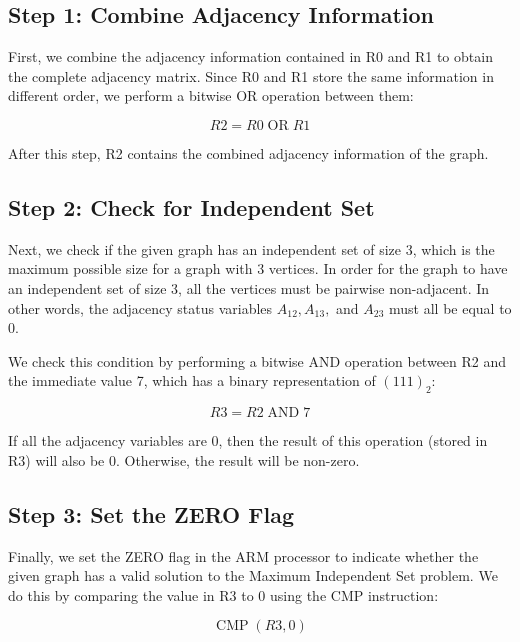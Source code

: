 \subsection{Step 1: Combine Adjacency Information}

First, we combine the adjacency information contained in R0 and R1 to obtain the complete adjacency matrix. Since R0 and R1 store the same information in different order, we perform a bitwise OR operation between them:

\begin{equation}
    R2 = R0 \operatorname{OR} R1
\end{equation}

After this step, R2 contains the combined adjacency information of the graph.

\subsection{Step 2: Check for Independent Set}

Next, we check if the given graph has an independent set of size 3, which is the maximum possible size for a graph with 3 vertices. In order for the graph to have an independent set of size 3, all the vertices must be pairwise non-adjacent. In other words, the adjacency status variables $A_{12}, A_{13},$ and $A_{23}$ must all be equal to 0.

We check this condition by performing a bitwise AND operation between R2 and the immediate value 7, which has a binary representation of $(111)_2$:

\begin{equation}
    R3 = R2 \operatorname{AND} 7
\end{equation}

If all the adjacency variables are 0, then the result of this operation (stored in R3) will also be 0. Otherwise, the result will be non-zero.

\subsection{Step 3: Set the ZERO Flag}

Finally, we set the ZERO flag in the ARM processor to indicate whether the given graph has a valid solution to the Maximum Independent Set problem. We do this by comparing the value in R3 to 0 using the CMP instruction:

\begin{equation}
    \operatorname{CMP}(R3, 0)
\end{equation}

